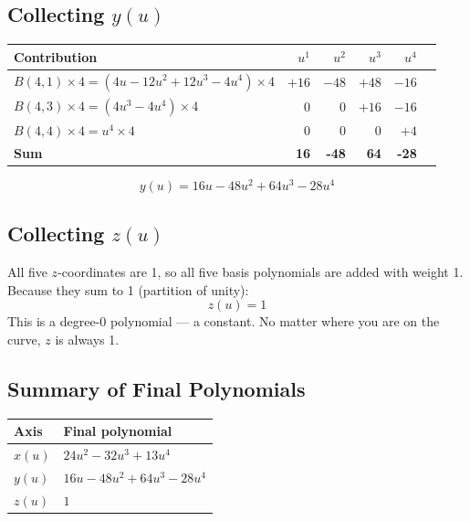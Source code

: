 \documentclass[12pt, a4paper]{article}
\begin{document}
\subsection{Collecting $y(u)$}

\begin{examplebox}
\begin{center}
\begin{tabular}{lrrrrr}
\toprule
Contribution & $u^1$ & $u^2$ & $u^3$ & $u^4$ \\
\midrule
$B(4,1) \times 4 = (4u - 12u^2 + 12u^3 - 4u^4) \times 4$ & $+16$ & $-48$ & $+48$ & $-16$ \\
$B(4,3) \times 4 = (4u^3 - 4u^4) \times 4$                & $0$   & $0$   & $+16$ & $-16$ \\
$B(4,4) \times 4 = u^4 \times 4$                          & $0$   & $0$   & $0$   & $+4$  \\
\midrule
\textbf{Sum} & \textbf{16} & \textbf{-48} & \textbf{64} & \textbf{-28} \\
\bottomrule
\end{tabular}
\end{center}

\medskip
\[
  y(u) = 16u - 48u^2 + 64u^3 - 28u^4
\]
\end{examplebox}

\subsection{Collecting $z(u)$}

\begin{examplebox}
All five $z$-coordinates are 1, so all five basis polynomials are
added with weight 1.
Because they sum to 1 (partition of unity):
\[
  z(u) = 1
\]
This is a degree-0 polynomial --- a constant.
No matter where you are on the curve, $z$ is always 1.
\end{examplebox}

\subsection{Summary of Final Polynomials}

\begin{center}
\begin{tabular}{ll}
\toprule
Axis & Final polynomial \\
\midrule
$x(u)$ & $24u^2 - 32u^3 + 13u^4$ \\
$y(u)$ & $16u - 48u^2 + 64u^3 - 28u^4$ \\
$z(u)$ & $1$ \\
\bottomrule
\end{tabular}
\end{center}
\end{document}
